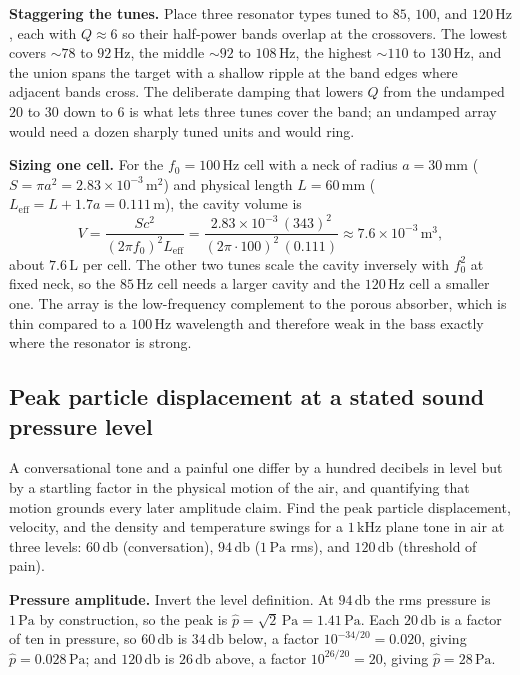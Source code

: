 \textbf{Staggering the tunes.} Place three resonator types tuned to $85$,
$100$, and $120\,\si{\hertz}$, each with $Q\approx 6$ so their half-power
bands overlap at the crossovers. The lowest covers $\sim 78$ to
$92\,\si{\hertz}$, the middle $\sim 92$ to $108\,\si{\hertz}$, the highest
$\sim 110$ to $130\,\si{\hertz}$, and the union spans the target with a
shallow ripple at the band edges where adjacent bands cross. The deliberate
damping that lowers $Q$ from the undamped $20$ to $30$ down to $6$ is what
lets three tunes cover the band; an undamped array would need a dozen
sharply tuned units and would ring.

\textbf{Sizing one cell.} For the $f_0=100\,\si{\hertz}$ cell with a neck of
radius $a=30\,\si{\milli\meter}$ ($S=\pi a^2=2.83\times
10^{-3}\,\si{\meter\squared}$) and physical length $L=60\,\si{\milli\meter}$
($L_{\text{eff}}=L+1.7a=0.111\,\si{\meter}$), the cavity volume is
\[
V = \frac{S c^2}{(2\pi f_0)^2 L_{\text{eff}}}
  = \frac{2.83\times 10^{-3}\,(343)^2}{(2\pi\cdot 100)^2\,(0.111)}
  \approx 7.6\times 10^{-3}\,\si{\meter\cubed},
\]
about $7.6\,\si{\liter}$ per cell. The other two tunes scale the cavity
inversely with $f_0^2$ at fixed neck, so the $85\,\si{\hertz}$ cell needs a
larger cavity and the $120\,\si{\hertz}$ cell a smaller one. The array is
the low-frequency complement to the porous absorber, which is thin compared
to a $100\,\si{\hertz}$ wavelength and therefore weak in the bass exactly
where the resonator is strong.

\subsection{Peak particle displacement at a stated sound pressure level}

A conversational tone and a painful one differ by a hundred decibels in
level but by a startling factor in the physical motion of the air, and
quantifying that motion grounds every later amplitude claim. Find the peak
particle displacement, velocity, and the density and temperature swings for
a $1\,\si{\kilo\hertz}$ plane tone in air at three levels: $60\,\si{
\decibel}$ (conversation), $94\,\si{\decibel}$ ($1\,\si{\pascal}$ rms), and
$120\,\si{\decibel}$ (threshold of pain).

\textbf{Pressure amplitude.} Invert the level definition. At
$94\,\si{\decibel}$ the rms pressure is $1\,\si{\pascal}$ by construction,
so the peak is $\hat p = \sqrt2\,\si{\pascal} = 1.41\,\si{\pascal}$. Each
$20\,\si{\decibel}$ is a factor of ten in pressure, so $60\,\si{\decibel}$
is $34\,\si{\decibel}$ below, a factor $10^{-34/20} = 0.020$, giving
$\hat p = 0.028\,\si{\pascal}$; and $120\,\si{\decibel}$ is $26\,\si{
\decibel}$ above, a factor $10^{26/20} = 20$, giving
$\hat p = 28\,\si{\pascal}$.


